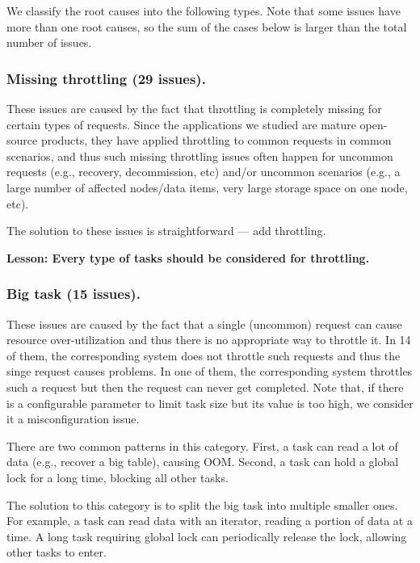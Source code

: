 We classify the root causes into the following types. Note that some issues have more than
one root causes, so the sum of the cases below is larger than the total number of issues.

\subsubsection{Missing throttling (29 issues).} These issues are caused by the fact that throttling
is completely missing for certain types of requests. Since the applications we studied are mature
open-source products, they have applied throttling to common requests in common scenarios, and thus
such missing throttling issues often happen for uncommon requests (e.g., recovery, decommission, etc)
and/or uncommon scenarios (e.g., a large number of affected nodes/data items, very large storage space on one node, etc).

The solution to these issues is straightforward --- add throttling.

\noindent
\textbf{Lesson: Every type of tasks should be considered for throttling.}

\subsubsection{Big task (15 issues).} These issues are caused by the fact that a single (uncommon) request
can cause resource over-utilization and thus there is no appropriate way to throttle it. In 14 of them,
the corresponding system does not throttle such requests and thus the singe request causes problems. In one
of them, the corresponding system throttles such a request but then the request can never get completed.
Note that, if there is a configurable parameter to limit task size but its value is too high, we consider it a
misconfiguration issue.

There are two common patterns in this category. First, a task can read a lot of data (e.g., recover a big
table), causing OOM. Second, a task can hold a global lock for a long time, blocking all other tasks.

The solution to this category is to split the big task into multiple smaller ones. For example, a task can
read data with an iterator, reading a portion of data at a time. A long task requiring global lock can
periodically release the lock, allowing other tasks to enter.

